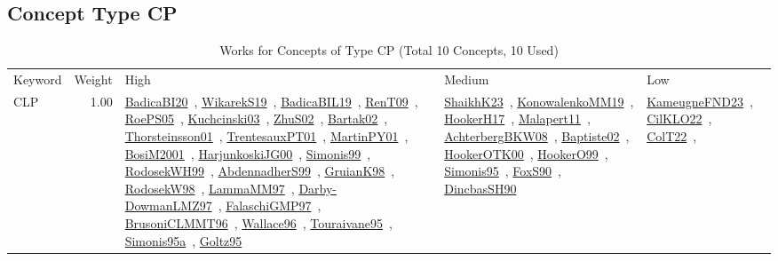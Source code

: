 \clearpage
\subsection{Concept Type CP}
\label{sec:CP}
\label{CP}
{\scriptsize
\begin{longtable}{p{3cm}r>{\raggedright\arraybackslash}p{6cm}>{\raggedright\arraybackslash}p{6cm}>{\raggedright\arraybackslash}p{8cm}}
\rowcolor{white}\caption{Works for Concepts of Type CP (Total 10 Concepts, 10 Used)}\\ \toprule
\rowcolor{white}Keyword & Weight & High & Medium & Low\\ \midrule\endhead
\bottomrule
\endfoot
\index{CLP}\index{CP!CLP}CLP &  1.00 & \href{../works/BadicaBI20.pdf}{BadicaBI20}~\cite{BadicaBI20}, \href{../works/WikarekS19.pdf}{WikarekS19}~\cite{WikarekS19}, \href{../works/BadicaBIL19.pdf}{BadicaBIL19}~\cite{BadicaBIL19}, \href{../works/RenT09.pdf}{RenT09}~\cite{RenT09}, \href{../works/RoePS05.pdf}{RoePS05}~\cite{RoePS05}, \href{../works/Kuchcinski03.pdf}{Kuchcinski03}~\cite{Kuchcinski03}, \href{../works/ZhuS02.pdf}{ZhuS02}~\cite{ZhuS02}, \href{../works/Bartak02.pdf}{Bartak02}~\cite{Bartak02}, \href{../works/Thorsteinsson01.pdf}{Thorsteinsson01}~\cite{Thorsteinsson01}, \href{../works/TrentesauxPT01.pdf}{TrentesauxPT01}~\cite{TrentesauxPT01}, \href{../works/MartinPY01.pdf}{MartinPY01}~\cite{MartinPY01}, \href{../works/BosiM2001.pdf}{BosiM2001}~\cite{BosiM2001}, \href{../works/HarjunkoskiJG00.pdf}{HarjunkoskiJG00}~\cite{HarjunkoskiJG00}, \href{../works/Simonis99.pdf}{Simonis99}~\cite{Simonis99}, \href{../works/RodosekWH99.pdf}{RodosekWH99}~\cite{RodosekWH99}, \href{../works/AbdennadherS99.pdf}{AbdennadherS99}~\cite{AbdennadherS99}, \href{../works/GruianK98.pdf}{GruianK98}~\cite{GruianK98}, \href{../works/RodosekW98.pdf}{RodosekW98}~\cite{RodosekW98}, \href{../works/LammaMM97.pdf}{LammaMM97}~\cite{LammaMM97}, \href{../works/Darby-DowmanLMZ97.pdf}{Darby-DowmanLMZ97}~\cite{Darby-DowmanLMZ97}, \href{../works/FalaschiGMP97.pdf}{FalaschiGMP97}~\cite{FalaschiGMP97}, \href{../works/BrusoniCLMMT96.pdf}{BrusoniCLMMT96}~\cite{BrusoniCLMMT96}, \href{../works/Wallace96.pdf}{Wallace96}~\cite{Wallace96}, \href{../works/Touraivane95.pdf}{Touraivane95}~\cite{Touraivane95}, \href{../works/Simonis95a.pdf}{Simonis95a}~\cite{Simonis95a}, \href{../works/Goltz95.pdf}{Goltz95}~\cite{Goltz95} & \href{../works/ShaikhK23.pdf}{ShaikhK23}~\cite{ShaikhK23}, \href{../works/KonowalenkoMM19.pdf}{KonowalenkoMM19}~\cite{KonowalenkoMM19}, \href{../works/HookerH17.pdf}{HookerH17}~\cite{HookerH17}, \href{../works/Malapert11.pdf}{Malapert11}~\cite{Malapert11}, \href{../works/AchterbergBKW08.pdf}{AchterbergBKW08}~\cite{AchterbergBKW08}, \href{../works/Baptiste02.pdf}{Baptiste02}~\cite{Baptiste02}, \href{../works/HookerOTK00.pdf}{HookerOTK00}~\cite{HookerOTK00}, \href{../works/HookerO99.pdf}{HookerO99}~\cite{HookerO99}, \href{../works/Simonis95.pdf}{Simonis95}~\cite{Simonis95}, \href{../works/FoxS90.pdf}{FoxS90}~\cite{FoxS90}, \href{../works/DincbasSH90.pdf}{DincbasSH90}~\cite{DincbasSH90} & \href{../works/KameugneFND23.pdf}{KameugneFND23}~\cite{KameugneFND23}, \href{../works/CilKLO22.pdf}{CilKLO22}~\cite{CilKLO22}, \href{../works/ColT22.pdf}{ColT22}~\cite{ColT22}, 
\end{longtable}}
